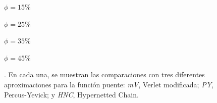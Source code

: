 \begin{figure}[p]
{    \begin{enumerate*}[label=(\alph*),itemjoin={,\enspace}]
        \item $\phi=15\%$
        \item $\phi=25\%$
        \item $\phi=35\%$
        \item $\phi=45\%$
    \end{enumerate*}
    . En cada una, se muestran las comparaciones con tres diferentes aproximaciones para la función puente: \emph{mV}, Verlet modificada; \emph{PY}, Percus-Yevick; y \emph{HNC}, Hypernetted Chain.
    }
    \label{fig:estructuras-neuronales}
\end{figure}
